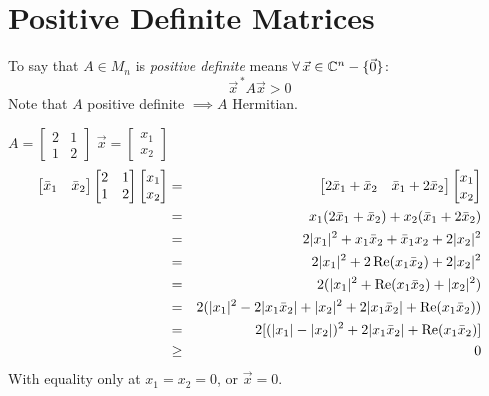 \documentclass[letterpaper,12pt,fleqn]{article}
\newcommand{\vx}{\vec{x}}
\newcommand{\vxct}{\vx^{\,*}}
\newcommand{\vz}{\vec{0}}
\newcommand{\bx}{\bar{x}}
\DeclareMathOperator{\Real}{Re}
\begin{document}
\section*{Positive Definite Matrices}

\begin{definition}
  To say that $A\in M_n$ is \emph{positive definite} means
  $\forall\,\vx\in\C^n-\{\vz\}$:
  \[\vxct A\vx>0\]
  Note that $A$ positive definite $\implies A$ Hermitian.
\end{definition}

\begin{example}
  $A=\begin{bmatrix} 2 & 1 \\ 1 & 2 \end{bmatrix}$\hspace{4ex}
  $\vx=\begin{bmatrix} x_1 \\ x_2 \end{bmatrix}$
  \begin{eqnarray*}
    \begin{bmatrix} \bx_1 & \bx_2 \end{bmatrix}
    \begin{bmatrix} 2 & 1 \\ 1 & 2 \end{bmatrix}
    \begin{bmatrix} x_1 \\ x_2 \end{bmatrix} &=&
    \begin{bmatrix} 2\bx_1+\bx_2 & \bx_1+2\bx_2 \end{bmatrix}
    \begin{bmatrix} x_1 \\ x_2 \end{bmatrix} \\
    &=& x_1(2\bx_1+\bx_2)+x_2(\bx_1+2\bx_2) \\
    &=& 2\abs{x_1}^2+x_1\bx_2+\bx_1x_2+2\abs{x_2}^2 \\
    &=& 2\abs{x_1}^2+2\Real(x_1\bx_2)+2\abs{x_2}^2 \\
    &=& 2(\abs{x_1}^2+\Real(x_1\bx_2)+\abs{x_2}^2) \\
    &=& 2(\abs{x_1}^2-2\abs{x_1\bx_2}+\abs{x_2}^2+
    2\abs{x_1\bx_2}+\Real(x_1\bx_2)) \\
    &=& 2[(\abs{x_1}-\abs{x_2})^2+2\abs{x_1\bx_2}+\Real(x_1\bx_2)] \\
    &\ge& 0
  \end{eqnarray*}
  With equality only at $x_1=x_2=0$, or $\vx=0$.
\end{example}
\end{document}
